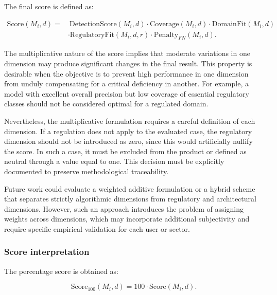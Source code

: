 \documentclass[11pt,a4paper]{article}
\begin{document}
The final score is defined as:

\begin{equation}

\begin{aligned}
    \mathrm{Score}(M_i,d)=&\
    \mathrm{DetectionScore}(M_i,d)
    \cdot \mathrm{Coverage}(M_i,d)
    \cdot \mathrm{DomainFit}(M_i,d) \\
    &\cdot \mathrm{RegulatoryFit}(M_i,d,r)
    \cdot \mathrm{Penalty}_{FN}(M_i,d).
\end{aligned}

\end{equation}

The multiplicative nature of the score implies that moderate variations in one dimension may produce significant changes in the final result. This property is desirable when the objective is to prevent high performance in one dimension from unduly compensating for a critical deficiency in another. For example, a model with excellent overall precision but low coverage of essential regulatory classes should not be considered optimal for a regulated domain.

Nevertheless, the multiplicative formulation requires a careful definition of each dimension. If a regulation does not apply to the evaluated case, the regulatory dimension should not be introduced as zero, since this would artificially nullify the score. In such a case, it must be excluded from the product or defined as neutral through a value equal to one. This decision must be explicitly documented to preserve methodological traceability.

Future work could evaluate a weighted additive formulation or a hybrid scheme that separates strictly algorithmic dimensions from regulatory and architectural dimensions. However, such an approach introduces the problem of assigning weights across dimensions, which may incorporate additional subjectivity and require specific empirical validation for each user or sector.

\subsubsection{Score interpretation}

The percentage score is obtained as:

\begin{equation}
    \mathrm{Score}_{100}(M_i,d)=100\cdot \mathrm{Score}(M_i,d).
\end{equation}
\end{document}
